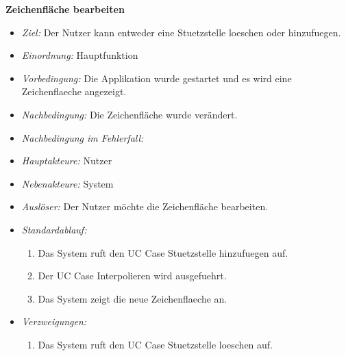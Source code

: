 \textbf{Zeichenfl\"ache bearbeiten}
  \begin{itemize}
  \item \textit{Ziel:} Der Nutzer kann entweder eine Stuetzstelle loeschen oder hinzufuegen.
  \item \textit{Einordnung:} Hauptfunktion
  \item \textit{Vorbedingung:} Die Applikation wurde gestartet und es wird eine Zeichenflaeche angezeigt.
  \item \textit{Nachbedingung:} Die Zeichenfl\"ache wurde ver\"andert.
  \item \textit{Nachbedingung im Fehlerfall:} 
  \item \textit{Hauptakteure:} Nutzer
  \item \textit{Nebenakteure:} System
  \item \textit{Ausl\"oser:} Der Nutzer m\"ochte die Zeichenfl\"ache bearbeiten.
  \item \textit{Standardablauf:}
    \begin{enumerate}[label=(\arabic*)]
    \item Das System ruft den UC Case Stuetzstelle hinzufuegen auf.
    \item Der UC Case Interpolieren wird ausgefuehrt.
    \item Das System zeigt die neue Zeichenflaeche an.
    \end{enumerate}
  \item \textit{Verzweigungen:}
    \begin{enumerate}[label=(1\alph*)]
\item Das System ruft den UC Case Stuetzstelle loeschen auf.
    \end{enumerate}
  \end{itemize}